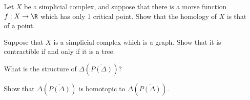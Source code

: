 \begin{exercise}
Let $X$ be a simplicial complex, and suppose that there is a morse function $f: X\to \R$ which has only 1 critical point. Show that the homology of $X$ is that of a point. 
\end{exercise}

\begin{exercise}
Suppose that $X$ is a simplicial complex which is a graph. Show that it is contractible if and only if it is a tree. 
\end{exercise}


\begin{exercise}
What is the structure of $\Delta(\overline {P(\Delta)})$?
\end{exercise}

\begin{exercise}
Show that $\Delta(\overline{P(\Delta)})$ is homotopic to $\Delta(\overline{P(\Delta)})$.  
\end{exercise}